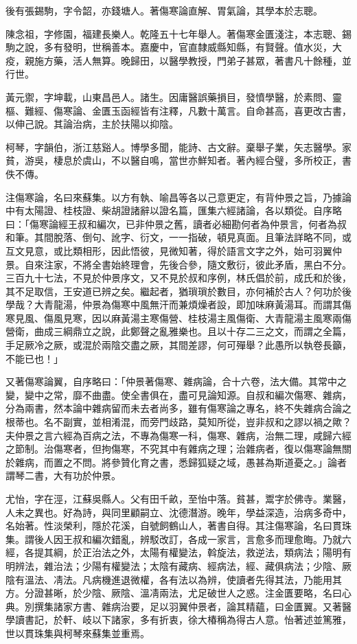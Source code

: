 \begin{pinyinscope}
後有張錫駒，字令韶，亦錢塘人。著傷寒論直解、胃氣論，其學本於志聰。

陳念祖，字修園，福建長樂人。乾隆五十七年舉人。著傷寒金匱淺注，本志聰、錫駒之說，多有發明，世稱善本。嘉慶中，官直隸威縣知縣，有賢聲。值水災，大疫，親施方藥，活人無算。晚歸田，以醫學教授，門弟子甚眾，著書凡十餘種，並行世。

黃元禦，字坤載，山東昌邑人。諸生。因庸醫誤藥損目，發憤學醫，於素問、靈樞、難經、傷寒論、金匱玉函經皆有注釋，凡數十萬言。自命甚高，喜更改古書，以伸己說。其論治病，主於扶陽以抑陰。

柯琴，字韻伯，浙江慈谿人。博學多聞，能詩、古文辭。棄舉子業，矢志醫學。家貧，游吳，棲息於虞山，不以醫自鳴，當世亦鮮知者。著內經合璧，多所校正，書佚不傳。

注傷寒論，名曰來蘇集。以方有執、喻昌等各以己意更定，有背仲景之旨，乃據論中有太陽證、桂枝證、柴胡證諸辭以證名篇，匯集六經諸論，各以類從。自序略曰：「傷寒論經王叔和編次，已非仲景之舊，讀者必細勘何者為仲景言，何者為叔和筆。其間脫落、倒句、訛字、衍文，一一指破，頓見真面。且筆法詳略不同，或互文見意，或比類相形，因此悟彼，見微知著，得於語言文字之外，始可羽翼仲景。自來注家，不將全書始終理會，先後合參，隨文敷衍，彼此矛盾，黑白不分。三百九十七法，不見於仲景序文，又不見於叔和序例，林氏倡於前，成氏和於後，其不足取信，王安道已辨之矣。繼起者，猶瑣瑣於數目，亦何補於古人？何功於後學哉？大青龍湯，仲景為傷寒中風無汗而兼煩燥者設，即加味麻黃湯耳。而謂其傷寒見風、傷風見寒，因以麻黃湯主寒傷營、桂枝湯主風傷衛、大青龍湯主風寒兩傷營衛，曲成三綱鼎立之說，此鄭聲之亂雅樂也。且以十存二三之文，而謂之全篇，手足厥冷之厥，或混於兩陰交盡之厥，其間差謬，何可殫舉？此愚所以執卷長籲，不能已也！」

又著傷寒論翼，自序略曰：「仲景著傷寒、雜病論，合十六卷，法大備。其常中之變，變中之常，靡不曲盡。使全書俱在，盡可見論知源。自叔和編次傷寒、雜病，分為兩書，然本論中雜病留而未去者尚多，雖有傷寒論之專名，終不失雜病合論之根蒂也。名不副實，並相淆混，而旁門歧路，莫知所從，豈非叔和之謬以禍之歟？夫仲景之言六經為百病之法，不專為傷寒一科，傷寒、雜病，治無二理，咸歸六經之節制。治傷寒者，但拘傷寒，不究其中有雜病之理；治雜病者，復以傷寒論無關於雜病，而置之不問。將參贊化育之書，悉歸狐疑之域，愚甚為斯道憂之。」論者謂琴二書，大有功於仲景。

尤怡，字在涇，江蘇吳縣人。父有田千畝，至怡中落。貧甚，鬻字於佛寺。業醫，人未之異也。好為詩，與同里顧嗣立、沈德潛游。晚年，學益深造，治病多奇中，名始著。性淡榮利，隱於花溪，自號飼鶴山人，著書自得。其注傷寒論，名曰貫珠集。謂後人因王叔和編次錯亂，辨駁改訂，各成一家言，言愈多而理愈晦。乃就六經，各提其綱，於正治法之外，太陽有權變法，斡旋法，救逆法，類病法；陽明有明辨法，雜治法；少陽有權變法；太陰有藏病、經病法，經、藏俱病法；少陰、厥陰有溫法、凊法。凡病機進退微權，各有法以為辨，使讀者先得其法，乃能用其方。分證甚晰，於少陰、厥陰、溫凊兩法，尤足破世人之惑。注金匱要略，名曰心典。別撰集諸家方書、雜病治要，足以羽翼仲景者，論其精蘊，曰金匱翼。又著醫學讀書記，於軒、岐以下諸家，多有折衷，徐大椿稱為得古人意。怡著述並篤雅，世以貫珠集與柯琴來蘇集並重焉。


\end{pinyinscope}
